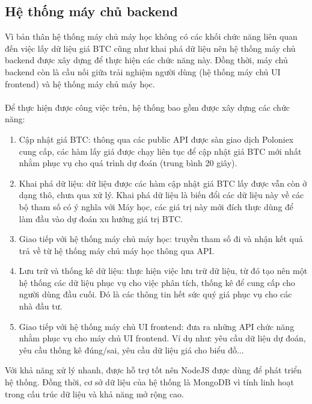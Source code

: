 \subsection{ Hệ thống máy chủ backend}
Vì bản thân hệ thống máy chủ máy học không có các khối chức năng liên quan đến 
việc lấy dữ liệu giá BTC cũng như khai phá dữ liệu nên hệ thống máy chủ backend 
được xây dựng để thực hiện các chức năng này. Đồng thời, máy chủ backend còn là 
cầu nối giữa trải nghiệm người dùng (hệ thống máy chủ UI frontend) và hệ thống 
máy chủ máy học.\\\\
Để thực hiện được công việc trên, hệ thống bao gồm được xây dựng các chức năng:
\begin{enumerate}
\item Cập nhật giá BTC: thông qua các public API được sàn giao dịch Poloniex 
cung cấp, các hàm lấy giá được chạy liên tục để cập nhật giá BTC mới nhất nhằm 
phục vụ cho quá trình dự đoán (trung bình 20 giây).
\item Khai phá dữ liệu: dữ liệu được các hàm cập nhật giá BTC lấy được vẫn 
còn ở dạng thô, chưa qua xử lý. Khai phá dữ liệu là biến đổi các dữ liệu này 
về các bộ tham số có ý nghĩa với Máy học, các giá trị này mới đích thực 
dùng để làm đầu vào dự đoán xu hướng giá trị BTC.
\item Giao tiếp với hệ thống máy chủ máy học: truyền tham số đi và nhận 
kết quả trả về từ hệ thống máy chủ máy học thông qua API.
\item Lưu trữ và thống kê dữ liệu: thực hiện việc lưu trữ dữ liệu, từ đó tạo 
nên một hệ thống các dữ liệu phục vụ cho việc phân tích, thống kê để cung cấp 
cho người dùng đầu cuối. Đó là các thông tin hết sức quý giá phục vụ cho các 
nhà đầu tư.
\item Giao tiếp với hệ thống máy chủ UI frontend: đưa ra những API chức năng 
nhằm phục vụ cho máy chủ UI frontend. Ví dụ như: yêu cầu dữ liệu dự đoán, yêu 
cầu thống kê đúng/sai, yêu cầu dữ liệu giá cho biểu đồ...
\end{enumerate}
Với khả năng xử lý nhanh, được hỗ trợ tốt nên NodeJS được dùng để phát triển 
hệ thống. Đồng thời, cơ sở dữ liệu của hệ thống là MongoDB vì tính linh hoạt 
trong cấu trúc dữ liệu và khả năng mở rộng cao.
